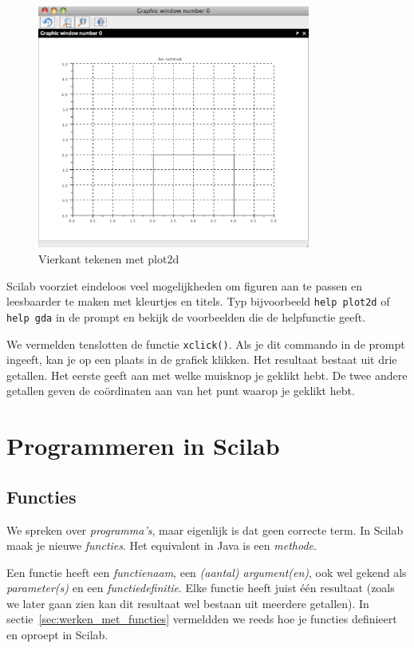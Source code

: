\begin{figure}[h!t]
   \begin{center}
    \includegraphics[width=0.8\textwidth]{figuren/scilab/11grafiek}
    \caption{Vierkant tekenen met plot2d}
	\label{figg:vierkant}
	\end{center}
\end{figure}

Scilab voorziet eindeloos veel mogelijkheden om figuren aan te passen en leesbaarder te maken met kleurtjes en titels. Typ bijvoorbeeld \verb+help plot2d+ of \verb+help gda+ in de prompt en bekijk de voorbeelden die de helpfunctie geeft.
 
 We vermelden tenslotten de functie \verb/xclick()/. Als je dit commando in de prompt ingeeft, kan je op een plaats in de grafiek klikken. Het resultaat bestaat uit drie getallen. Het eerste geeft aan met welke muisknop je geklikt hebt. De twee andere getallen geven de coördinaten aan van het punt waarop je geklikt hebt.

\section{Programmeren in Scilab}
\subsection{Functies}

We spreken over \emph{programma's}, maar eigenlijk is dat geen correcte term. In Scilab maak je nieuwe \emph{functies}. Het equivalent in Java is een \emph{methode}. 

Een functie heeft een \emph{functienaam}, een \emph{(aantal) argument(en)}, ook wel gekend als \emph{parameter(s)} en een \emph{functiedefinitie}. Elke functie heeft juist \'e\'en resultaat (zoals we later gaan zien kan dit resultaat wel bestaan uit meerdere getallen). In 
sectie~\ref{sec:werken_met_functies} vermeldden we reeds hoe je functies definieert en oproept in Scilab.


